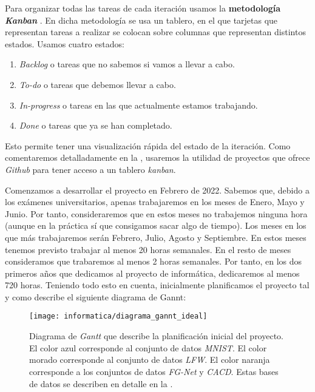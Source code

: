 Para organizar todas las tareas de cada iteración usamos la \textbf{metodología \textit{Kanban}} \cite{informatica:kanban_paper}. En dicha metodología se usa un tablero, en el que tarjetas que representan tareas a realizar se colocan sobre columnas que representan distintos estados. Usamos cuatro estados:

\begin{enumerate}
	\item \textit{Backlog} o tareas que no sabemos si vamos a llevar a cabo.
	\item \textit{To-do} o tareas que debemos llevar a cabo.
	\item \textit{In-progress} o tareas en las que actualmente estamos trabajando.
	\item \textit{Done} o tareas que ya se han completado.
\end{enumerate}

Esto permite tener una visualización rápida del estado de la iteración. Como comentaremos detalladamente en la , usaremos la utilidad de proyectos que ofrece \textit{Github} para tener acceso a un tablero \textit{kanban}.

Comenzamos a desarrollar el proyecto en Febrero de 2022. Sabemos que, debido a los exámenes universitarios, apenas trabajaremos en los meses de Enero, Mayo y Junio. Por tanto, consideraremos que en estos meses no trabajemos ninguna hora (aunque en la práctica sí que consigamos sacar algo de tiempo). Los meses en los que más trabajaremos serán Febrero, Julio, Agosto y Septiembre. En estos meses tenemos previsto trabajar al menos 20 horas semanales. En el resto de meses consideramos que trabaremos al menos 2 horas semanales. Por tanto, en los dos primeros años que dedicamos al proyecto de informática, dedicaremos al menos 720 horas. Teniendo todo esto en cuenta, inicialmente planificamos el proyecto tal y como describe el siguiente diagrama de Gannt:

\begin{figure}[H]
	\centering
	\texttt{[image: informatica/diagrama\_gannt\_ideal]}
	\caption{Diagrama de \textit{Gantt} que describe la planificación inicial del proyecto. El color azul corresponde al conjunto de datos \textit{MNIST}. El color morado corresponde al conjunto de datos \textit{LFW}. El color naranja corresponde a los conjuntos de datos \textit{FG-Net} y \textit{CACD}. Estas bases de datos se describen en detalle en la .}
\end{figure}

